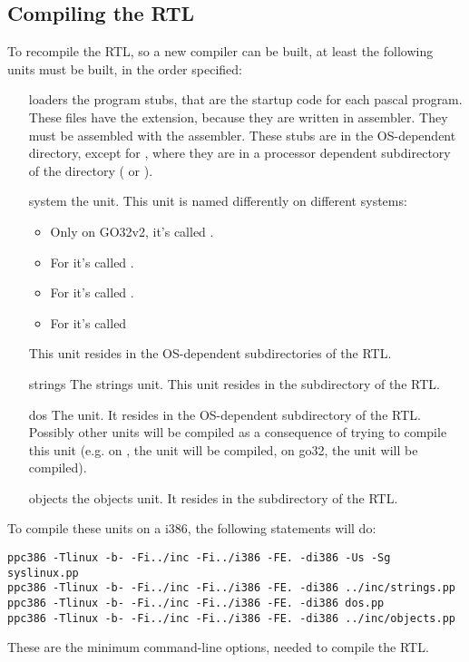 \subsection{Compiling the RTL}
To recompile the RTL, so a new compiler can be built, at least the following
units must be built, in the order specified:
\begin{enumerate}
\item[loaders] the program stubs, that are the startup code for each pascal
program. These files have the  extension, because they are written
in assembler. They must be assembled with the \gnu {} assembler. These stubs
are in the OS-dependent directory, except for \linux, where they are in a
processor dependent subdirectory of the \linux directory ( or
).
\item[system] the  unit. This unit is named differently on different
systems:
\begin{itemize}
\item Only on GO32v2, it's called .
\item For \linux it's called .
\item For \windowsnt it's called .
\item For \ostwo it's called 
\end{itemize}
This unit resides in the OS-dependent subdirectories of the RTL.
\item[strings] The strings unit. This unit resides in the 
subdirectory of the RTL.
\item[dos] The  unit. It resides in the OS-dependent subdirectory
of the RTL. Possibly other units will be compiled as a consequence of trying
to compile this unit (e.g. on \linux, the  unit will be
compiled, on go32, the  unit will be compiled).
\item[objects] the objects unit. It resides in the  subdirectory
of the RTL.
\end{enumerate}
To compile these units on a i386, the following statements will do:
\begin{verbatim}
ppc386 -Tlinux -b- -Fi../inc -Fi../i386 -FE. -di386 -Us -Sg syslinux.pp
ppc386 -Tlinux -b- -Fi../inc -Fi../i386 -FE. -di386 ../inc/strings.pp
ppc386 -Tlinux -b- -Fi../inc -Fi../i386 -FE. -di386 dos.pp
ppc386 -Tlinux -b- -Fi../inc -Fi../i386 -FE. -di386 ../inc/objects.pp
\end{verbatim}
These are the minimum command-line options, needed to compile the RTL.

